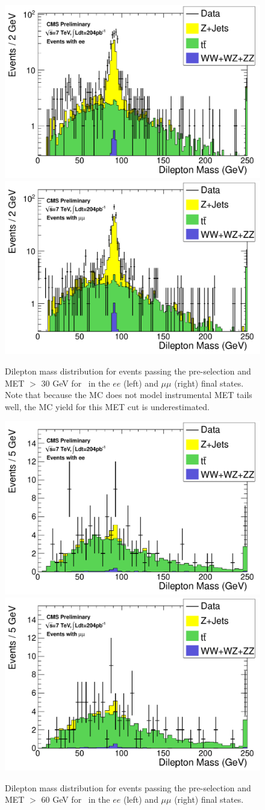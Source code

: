 \begin{figure}[hbt]
  \begin{center}
	\includegraphics[width=0.48\linewidth]{plots/hdilmass_pfmet30_ee_allj.pdf}
	\includegraphics[width=0.48\linewidth]{plots/hdilmass_pfmet30_mm_allj.pdf}
	\caption{
	  \label{fig:dilmass30}\protect 
	  Dilepton mass distribution for events passing the pre-selection 
	  and MET $>$ 30 GeV for \lumi\ in the $ee$ (left) and $\mu\mu$ (right) final states. 
	  Note that because the MC does not model instrumental MET tails well, the MC yield for this MET cut is underestimated.
	}
  \end{center}
\end{figure}

\begin{figure}[hbt]
  \begin{center}
	\includegraphics[width=0.48\linewidth]{plots/hdilmass_pfmet60_ee_allj.pdf}
	\includegraphics[width=0.48\linewidth]{plots/hdilmass_pfmet60_mm_allj.pdf}
	\caption{
	  \label{fig:dilmass60}\protect 
	  Dilepton mass distribution for events passing the pre-selection 
	  and MET $>$ 60 GeV for \lumi\ in the $ee$ (left) and $\mu\mu$ (right) final states. 
	}
  \end{center}
\end{figure}


